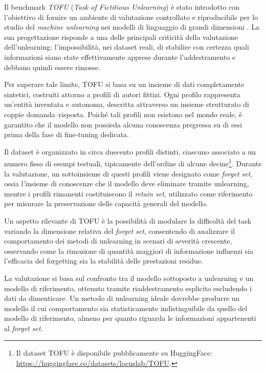 Il benchmark \textit{TOFU} (\emph{Task of Fictitious Unlearning}) è stato introdotto con l’obiettivo di fornire un ambiente di valutazione controllato e riproducibile per lo studio del \emph{machine unlearning} nei modelli di linguaggio di grandi dimensioni \cite{maini2024tofu}.  
La sua progettazione risponde a una delle principali criticità della valutazione dell’unlearning: l’impossibilità, nei dataset reali, di stabilire con certezza quali informazioni siano state effettivamente apprese durante l’addestramento e debbano quindi essere rimosse.

Per superare tale limite, TOFU si basa su un insieme di dati completamente sintetici, costruiti attorno a profili di autori fittizi.  
Ogni profilo rappresenta un’entità inventata e autonoma, descritta attraverso un insieme strutturato di coppie domanda–risposta.  
Poiché tali profili non esistono nel mondo reale, è garantito che il modello non possieda alcuna conoscenza pregressa su di essi prima della fase di fine-tuning dedicata.

Il dataset è organizzato in circa duecento profili distinti, ciascuno associato a un numero fisso di esempi testuali, tipicamente dell’ordine di alcune decine\footnote{Il dataset TOFU è disponibile pubblicamente su HuggingFace: \url{https://huggingface.co/datasets/locuslab/TOFU}.}.  
Durante la valutazione, un sottoinsieme di questi profili viene designato come \textit{forget set}, ossia l’insieme di conoscenze che il modello deve eliminare tramite unlearning, mentre i profili rimanenti costituiscono il \textit{retain set}, utilizzato come riferimento per misurare la preservazione delle capacità generali del modello.

Un aspetto rilevante di TOFU è la possibilità di modulare la difficoltà del task variando la dimensione relativa del \textit{forget set}, consentendo di analizzare il comportamento dei metodi di unlearning in scenari di severità crescente, osservando come la rimozione di quantità maggiori di informazione influenzi sia l’efficacia del forgetting sia la stabilità delle prestazioni residue.

La valutazione si basa sul confronto tra il modello sottoposto a unlearning e un modello di riferimento, ottenuto tramite riaddestramento esplicito escludendo i dati da dimenticare.  
Un metodo di unlearning ideale dovrebbe produrre un modello il cui comportamento sia statisticamente indistinguibile da quello del modello di riferimento, almeno per quanto riguarda le informazioni appartenenti al \textit{forget set}.  

